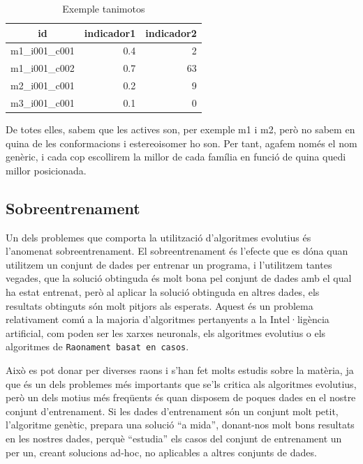 \begin{table}
\centering
\begin{tabular}{|l|r|r|}
\hline
\multicolumn{1}{|c|}{\textbf{id }} & \multicolumn{1}{c|}{\textbf{ indicador1 }} & \multicolumn{1}{c|}{\textbf{ indicador2}} \\
\hline
\hline
m1\_i001\_c001 & 0.4 & 2  \\
m1\_i001\_c002 & 0.7 & 63 \\
m2\_i001\_c001 & 0.2 & 9  \\
m3\_i001\_c001 & 0.1 & 0  \\
\hline
\end{tabular}
\caption{Exemple tanimotos}
\label{table:tanis}
\end{table}

De totes elles, sabem que les actives son, per exemple m1 i m2, però no sabem
en quina de les conformacions i estereoisomer ho son.  Per tant, agafem només el
nom genèric, i cada cop escollirem la millor de cada família en funció de quina
quedi millor posicionada.



\subsection{Sobreentrenament} %
\label{sub:sobreentrenament}

Un dels problemes que comporta la utilització d'algoritmes evolutius és
l'anomenat sobreentrenament.  El sobreentrenament és l'efecte que es dóna quan
utilitzem un conjunt de dades per entrenar un programa, i l'utilitzem tantes
vegades, que la solució obtinguda és molt bona pel conjunt de dades amb el qual
ha estat entrenat, però al aplicar la solució obtinguda en altres dades, els
resultats obtinguts són molt pitjors als esperats.  Aquest és un problema
relativament comú a la majoria d'algoritmes pertanyents a la Intel·ligència
artificial, com poden ser les xarxes neuronals, els algoritmes evolutius o els
algoritmes de \texttt{Raonament basat en casos}.

Això es pot donar per diverses raons i s'han fet molts estudis sobre la
matèria, ja que és un dels problemes més importants que se'ls critica als
algoritmes evolutius, però un dels motius més freqüents és quan
disposem de poques dades en el nostre conjunt d'entrenament.  Si les dades
d'entrenament són un conjunt molt petit, l'algoritme genètic, prepara una
solució ``a mida'', donant-nos molt bons resultats en les nostres dades, perquè
``estudia'' els casos del conjunt de entrenament un per un, creant solucions
ad-hoc, no aplicables a altres conjunts de dades.

